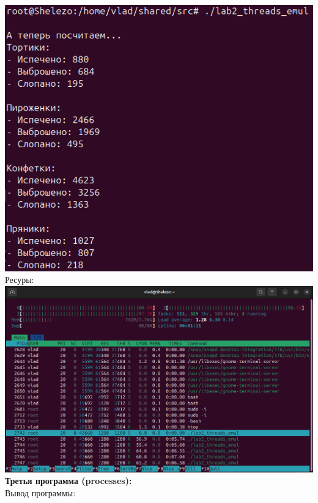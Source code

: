 \documentclass[a4paper,14pt]{extarticle}
\begin{document}
\includegraphics[width=140mm]{threads_emul_output_3}\\
Ресуры:\\
\includegraphics[width=140mm]{threads_emul_resources_3}\\
\textbf{Третья программа (processes):}\\
Вывод программы:\\
\end{document}
